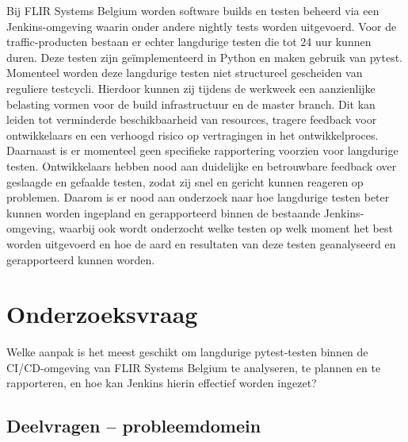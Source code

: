 {\color{red}
Bij FLIR Systems Belgium worden software builds en testen beheerd via een Jenkins-omgeving 
waarin onder andere nightly tests worden uitgevoerd. Voor de traffic-producten bestaan er 
echter langdurige testen die tot 24 uur kunnen duren. Deze testen zijn geïmplementeerd 
in Python en maken gebruik van pytest.
Momenteel worden deze langdurige testen niet structureel gescheiden van reguliere testcycli. 
Hierdoor kunnen zij tijdens de werkweek een aanzienlijke belasting vormen voor de build 
infrastructuur en de master branch. Dit kan leiden tot verminderde beschikbaarheid van 
resources, tragere feedback voor ontwikkelaars en een verhoogd risico op vertragingen in het 
ontwikkelproces. 
Daarnaast is er momenteel geen specifieke rapportering voorzien voor langdurige testen. 
Ontwikkelaars hebben nood aan duidelijke en betrouwbare feedback over geslaagde en gefaalde 
testen, zodat zij snel en gericht kunnen reageren op problemen.
Daarom is er nood aan onderzoek naar hoe langdurige testen beter kunnen worden ingepland en 
gerapporteerd binnen de bestaande Jenkins-omgeving, waarbij ook wordt onderzocht welke 
testen op welk moment het best worden uitgevoerd en hoe de aard en resultaten van deze testen 
geanalyseerd en gerapporteerd kunnen worden.
}


\section{Onderzoeksvraag}

{\color{red}
Welke aanpak is het meest geschikt om langdurige pytest-testen binnen de CI/CD-omgeving van FLIR Systems Belgium te analyseren, te plannen en te rapporteren, en hoe kan Jenkins hierin effectief worden ingezet?
}

\subsection*{Deelvragen – probleemdomein}

